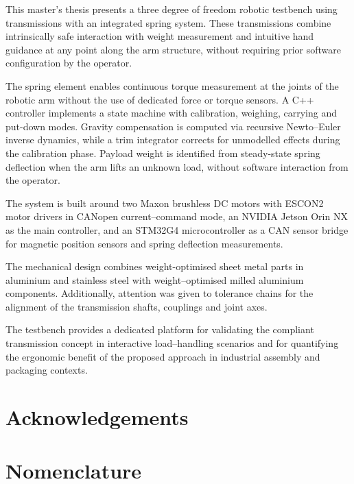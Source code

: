 \documentclass[11pt,a4paper,twoside,openright]{book}
\begin{document}
This master's thesis presents a three degree of freedom robotic testbench using transmissions with an integrated spring system. These transmissions combine intrinsically safe interaction with weight measurement and intuitive hand guidance at any point along the arm structure, without requiring prior software configuration by the operator.

The spring element enables continuous torque measurement at the joints of the robotic arm without the use of dedicated force or torque sensors. A C++ controller implements a state machine with calibration, weighing, carrying and put-down modes. Gravity compensation is computed via recursive Newto--Euler inverse dynamics, while a trim integrator corrects for unmodelled effects during the calibration phase. Payload weight is identified from steady-state spring deflection when the arm lifts an unknown load, without software interaction from the operator.

The system is built around two Maxon brushless DC motors with ESCON2 motor drivers in CANopen current--command mode, an NVIDIA Jetson Orin NX as the main controller, and an STM32G4 microcontroller as a CAN sensor bridge for magnetic position sensors and spring deflection measurements.

The mechanical design combines weight-optimised sheet metal parts in aluminium and stainless steel with weight--optimised milled aluminium components. Additionally, attention was given to tolerance chains for the alignment of the transmission shafts, couplings and joint axes.

The testbench provides a dedicated platform for validating the compliant transmission concept in interactive load--handling scenarios and for quantifying the ergonomic benefit of the proposed approach in industrial assembly and packaging contexts. 

\cleardoublepage

\chapter*{Acknowledgements}
\cleardoublepage

\tableofcontents
\cleardoublepage

\listoffigures
\cleardoublepage

\listoftables
\cleardoublepage

\chapter*{Nomenclature}
\end{document}
